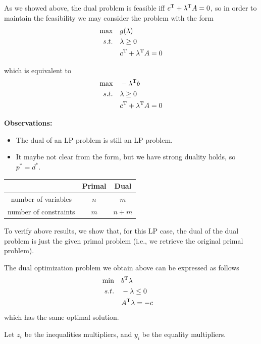 As we showed above, the dual problem is feasible iff $c^{{\rm T}}+\lambda^{{\rm T}}A=0$, so in order to maintain the feasibility we may consider the problem with the form
\begin{align*}
\max\quad &g(\lambda)\\
s.t.\quad &\lambda\geq 0\\
&c^{{\rm T}}+\lambda^{{\rm T}}A=0
\end{align*}

which is equivalent to
\begin{align*}
\max\quad &-\lambda^{{\rm T}}b\\
s.t.\quad &\lambda\geq 0\\
&c^{{\rm T}}+\lambda^{{\rm T}}A=0
\end{align*}


\textbf{Observations:}
\begin{itemize}
	\item The dual of an LP problem is still an LP problem.
	
	\item It maybe not clear from the form, but we have strong duality holds, so $p^*=d^*$.
\end{itemize}

\begin{center}
\begin{tabular}{|c|c|c|}
	\hline 
	&Primal & Dual\\
	\hline  
	number of variables & $n$ & $m$\\
	\hline 
	number of constraints&$m$&$n+m$\\
	\hline 
\end{tabular}
\end{center}


\vspace{0.3cm}
To verify above results, we show that, for this LP case, the dual of the dual problem is just the given primal problem (i.e., we retrieve the original primal problem).

The dual optimization problem we obtain above can be expressed as follows
\begin{align*}
\min\quad &b^{{\rm T}}\lambda\\
s.t.\quad &-\lambda\leq 0\quad\\
&A^{{\rm T}}\lambda = -c\quad 
\end{align*}
which has the same optimal solution.

Let $z_i$ be the inequalities multipliers, and $y_i$ be the equality multipliers.

